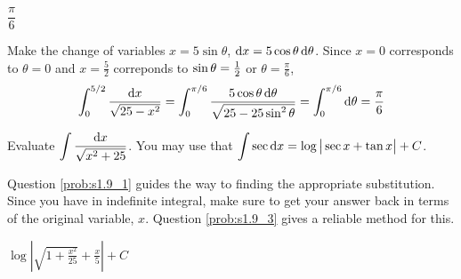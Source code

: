 \begin{answer}
$\dfrac{\pi}{6}$
\end{answer}

\begin{solution}
 Make the change of variables $x=5\sin\theta$, $\mathrm{d}x=5\cos\theta\,\mathrm{d}\theta$.
Since $x=0$ corresponds to $\theta=0$ and $x=\frac{5}{2}$ correponds to
$\sin\theta=\tfrac{1}{2}$ or $\theta =\frac{\pi}{6}$,
\begin{align*}
\int_0^{5/2} \frac{\mathrm{d}x}{\sqrt{25-x^2}}
=\int_0^{\pi/6} \frac{5\cos\theta\,\mathrm{d}\theta}{\sqrt{25-25\sin^2\theta}}
=\int_0^{\pi/6} \mathrm{d}\theta
=\frac{\pi}{6}
\end{align*}
\end{solution}

\begin{Mquestion}[M105 2015A]
Evaluate $\displaystyle\int \frac{\mathrm{d}x}{\sqrt{x^2+25}}$.
You may use that
${\displaystyle\int} \sec \mathrm{d}x = \log\big|\sec x+\tan x\big|+C$.
\end{Mquestion}

\begin{hint}
Question \ref{prob:s1.9_1} guides the way to finding the appropriate substitution. Since you have in indefinite integral, make sure to get your answer back in terms of the original variable, $x$. Question \ref{prob:s1.9_3} gives a reliable method for this.
\end{hint}

\begin{answer}
$\displaystyle\log\left|\sqrt{1+\frac{x^2}{25}}+\frac{x}{5}\right|+C$
\end{answer}

